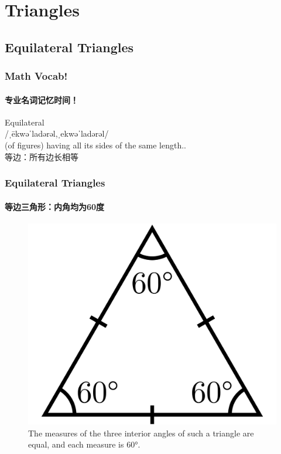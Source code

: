 \documentclass[
	11pt, %
	handout,
]{beamer}
\begin{document}

\section{Triangles}


\subsection{Equilateral Triangles}


\begin{frame}
	\frametitle{Math Vocab!} %
	\framesubtitle{专业名词记忆时间！}
	
	{\Huge Equilateral}\\
	{\LARGE /ˌēkwəˈladərəl,ˌekwəˈladərəl/\\
		\bigskip\bigskip
	(of figures) having all its sides of the same length.. \\ 
	等边：所有边长相等}

\end{frame}


\begin{frame}
	\frametitle{Equilateral Triangles} %
	\framesubtitle{等边三角形：内角均为60度}

		\begin{figure}
			\includegraphics[width=0.6\linewidth]{Triangle.Equilateral.svg.png}
			\caption{The measures of the three interior angles of such a triangle are
equal, and each measure is 60°.}
		\end{figure}
\end{frame}
\end{document}
